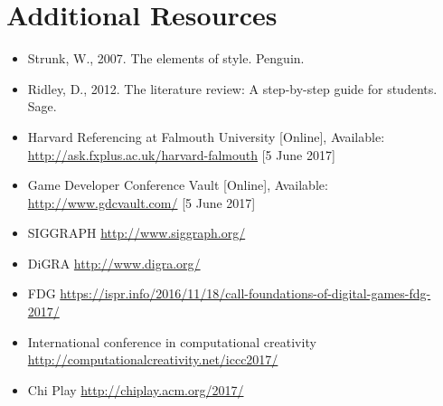 \documentclass{../fal_assignment}
\begin{document}
\section*{Additional Resources}

\begin{itemize}
     \item Strunk, W., 2007. The elements of style. Penguin.
     \item Ridley, D., 2012. The literature review: A step-by-step guide for students. Sage.
     \item Harvard Referencing at Falmouth University [Online], Available: \url{http://ask.fxplus.ac.uk/harvard-falmouth} [5 June 2017]
     \item Game Developer Conference Vault [Online], Available: \url{http://www.gdcvault.com/} [5 June 2017]
     \item SIGGRAPH \url{http://www.siggraph.org/}
     \item DiGRA \url{http://www.digra.org/}
     \item FDG \url{https://ispr.info/2016/11/18/call-foundations-of-digital-games-fdg-2017/}
     \item International conference in computational creativity \url{http://computationalcreativity.net/iccc2017/}
     \item Chi Play \url{http://chiplay.acm.org/2017/}
     
    
\end{itemize}
\end{document}
